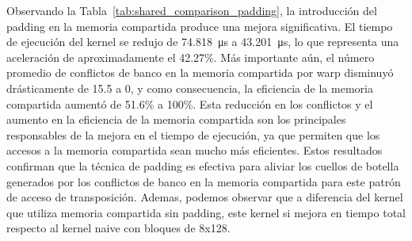 \documentclass[a4paper,11pt]{article}
\begin{document}
Observando la Tabla~\ref{tab:shared_comparison_padding}, la introducción del padding en la memoria compartida produce una mejora significativa. El tiempo de ejecución del kernel se redujo de \SI{74,818}{\micro\second} a \SI{43,201}{\micro\second}, lo que representa una aceleración de aproximadamente el 42.27\%.
Más importante aún, el número promedio de conflictos de banco en la memoria compartida por warp disminuyó drásticamente de 15.5 a 0, y como consecuencia, la eficiencia de la memoria compartida aumentó de 51.6\% a 100\%. Esta reducción en los conflictos y el aumento en la eficiencia de la memoria compartida son los principales responsables de la mejora en el tiempo de ejecución, ya que permiten que los accesos a la memoria compartida sean mucho más eficientes.
Estos resultados confirman que la técnica de padding es efectiva para aliviar los cuellos de botella generados por los conflictos de banco en la memoria compartida para este patrón de acceso de transposición. Ademas, podemos observar que a diferencia del kernel que utiliza memoria compartida sin padding, este kernel si mejora en tiempo total respecto al kernel naive con bloques de 8x128.
\end{document}
